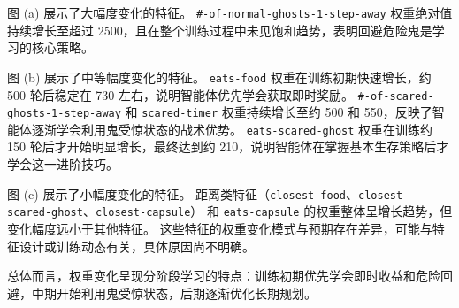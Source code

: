 图 (a) 展示了大幅度变化的特征。
\texttt{\#-of-normal-ghosts-1-step-away} 权重绝对值持续增长至超过 2500，且在整个训练过程中未见饱和趋势，表明回避危险鬼是学习的核心策略。

图 (b) 展示了中等幅度变化的特征。
\texttt{eats-food} 权重在训练初期快速增长，约 500 轮后稳定在 730 左右，说明智能体优先学会获取即时奖励。
\texttt{\#-of-scared-ghosts-1-step-away} 和 \texttt{scared-timer} 权重持续增长至约 500 和 550，反映了智能体逐渐学会利用鬼受惊状态的战术优势。
\texttt{eats-scared-ghost} 权重在训练约 150 轮后才开始明显增长，最终达到约 210，说明智能体在掌握基本生存策略后才学会这一进阶技巧。

图 (c) 展示了小幅度变化的特征。
距离类特征（\texttt{closest-food}、\texttt{closest-scared-ghost}、\texttt{closest-capsule}）
和 \texttt{eats-capsule} 的权重整体呈增长趋势，但变化幅度远小于其他特征。
这些特征的权重变化模式与预期存在差异，可能与特征设计或训练动态有关，具体原因尚不明确。

总体而言，权重变化呈现分阶段学习的特点：训练初期优先学会即时收益和危险回避，中期开始利用鬼受惊状态，后期逐渐优化长期规划。







